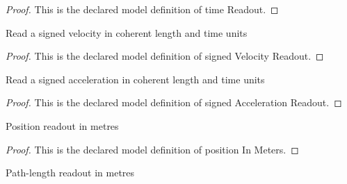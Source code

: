\begin{proof}
  This is the declared model definition of time Readout.
\end{proof}
\begin{definition}
  \label{def:physics:phyx-mini-0670:phyxminiproblems-problemphyxmini0670-signedvelocityreadout}
  Read a signed velocity in coherent length and time units
\end{definition}
\begin{proof}
  This is the declared model definition of signed Velocity Readout.
\end{proof}
\begin{definition}
  \label{def:physics:phyx-mini-0670:phyxminiproblems-problemphyxmini0670-signedaccelerationreadout}
  Read a signed acceleration in coherent length and time units
\end{definition}
\begin{proof}
  This is the declared model definition of signed Acceleration Readout.
\end{proof}
\begin{definition}
  \label{def:physics:phyx-mini-0670:phyxminiproblems-problemphyxmini0670-positioninmeters}
  Position readout in metres
\end{definition}
\begin{proof}
  This is the declared model definition of position In Meters.
\end{proof}
\begin{definition}
  \label{def:physics:phyx-mini-0670:phyxminiproblems-problemphyxmini0670-distanceinmeters}
  Path-length readout in metres
\end{definition}
